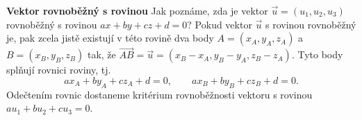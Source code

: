 \wikitextrule
\begin{example}\label{mai:exam042}
  \textbf{Vektor rovnoběžný s rovinou}\newline\small
   Jak poznáme, zda je vektor \(\vec{u} = (u_1, u_2, u_3)\) rovnoběžný s rovinou \(ax + by + cz + 
   d = 0\)? Pokud vektor \(\vec{u}\) s rovinou rovnoběžný je, pak zcela jistě existují v této 
   rovině dva body \(A = (x_A, y_A, z_A)\) a \(B = (x_B, y_B, z_B)\) tak, že \(\overrightarrow{AB} 
   = \vec{u} = (x_B - x_A, y_B - y_A, z_B - z_A)\). Tyto body splňují rovnici roviny, tj.
   \begin{equation*}
     ax_A + by_A + cz_A + d = 0,\qquad ax_B + by_B + cz_B + d = 0.
   \end{equation*}
   Odečtením rovnic dostaneme kritérium rovnoběžnosti vektoru s rovinou \(au_1 + bu_2+ cu_3 = 0\).
   \normalsize
\end{example}